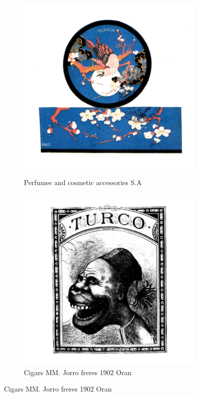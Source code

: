 \begin{figure}[h]
  \begin{subfigure}{.45\textwidth}
    \centering
    \includegraphics[width=.5\linewidth]{images/supplement/trademarks/french/15_9}
    \caption{Perfumes and cosmetic accessories S.A}
    \label{fig:trademarks:french:15.9}
  \end{subfigure}\hfill
  \begin{subfigure}{.45\textwidth}
    \centering
    \includegraphics[width=.5\linewidth]{images/supplement/trademarks/french/15_29}
    \caption{Cigars MM. Jorro freres 1902 Oran}
    \label{fig:trademarks:french:15.29}
  \end{subfigure}
\end{figure}

